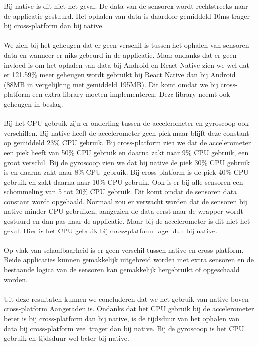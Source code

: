Bij native is dit niet het geval. De data van de sensoren wordt rechtstreeks naar de applicatie gestuurd.
Het ophalen van data is daardoor gemiddeld 10ms trager bij cross-platform dan bij native.
\\\\
We zien bij het geheugen dat er geen verschil is tussen het ophalen van sensoren data en wanneer er 
niks gebeurd in de applicatie. Maar ondanks dat er geen invloed is om het ophalen van data bij 
Android en React Native zien we wel dat er 121.59\% meer geheugen wordt gebruikt bij React Native dan 
bij Android (88MB in vergelijking met gemiddeld 195MB). Dit komt omdat we bij cross-platform een extra 
library moeten implementeren. Deze library neemt ook geheugen in beslag.
\\\\
Bij het CPU gebruik zijn er onderling tussen de accelerometer en gyroscoop ook verschillen. Bij native 
heeft de accelerometer geen piek maar blijft deze constant op gemiddeld 23\% CPU gebruik. Bij cross-platform zien we
dat de accelerometer een piek heeft van 50\% CPU gebruik en daarna zakt naar 9\% CPU gebruik, een groot verschil. 
Bij de gyroscoop zien we dat bij native de piek 30\% CPU gebruik is en daarna zakt naar 8\% CPU gebruik. Bij cross-platform
is de piek 40\% CPU gebruik en zakt daarna naar 10\% CPU gebruik. Ook is er bij alle sensoren een schommeling van 5 tot 20\% 
CPU gebruik. Dit komt omdat de sensoren data constant wordt opgehaald. Normaal zou er verwacht worden dat de sensoren bij native 
minder CPU gebruiken, aangezien de data eerst naar de wrapper wordt gestuurd en dan pas naar de applicatie. Maar bij 
de accelerometer is dit niet het geval. Hier is het CPU gebruik bij cross-platform lager dan bij native.
\\\\
Op vlak van schaalbaarheid is er geen verschil tussen native en cross-platform. Beide applicaties kunnen
gemakkelijk uitgebreid worden met extra sensoren en de bestaande logica van de sensoren kan gemakkelijk 
hergebruikt of opgeschaald worden.
\\\\
Uit deze resultaten kunnen we concluderen dat we het gebruik van native boven cross-platform Aangeraden is.
Ondanks dat het CPU gebruik bij de accelerometer beter is bij cross-platform dan bij native, is de tijdsduur
van het ophalen van data bij cross-platform veel trager dan bij native. Bij de gyroscoop is het CPU gebruik en 
tijdsduur wel beter bij native. 














